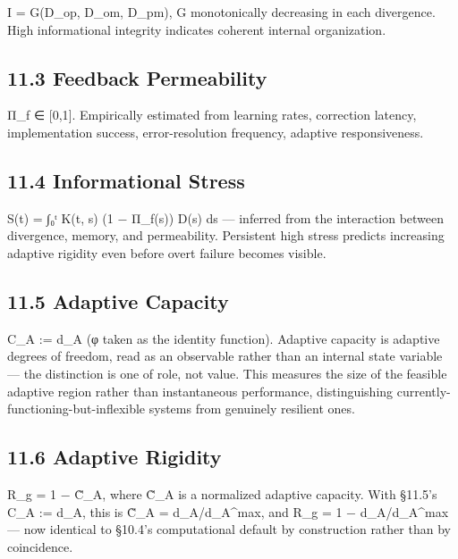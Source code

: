 \documentclass[
]{article}
\begin{document}
I = G(D\_op, D\_om, D\_pm), G monotonically decreasing in each
divergence. High informational integrity indicates coherent internal
organization.

\hypertarget{feedback-permeability-1}{%
\subsection{11.3 Feedback Permeability}\label{feedback-permeability-1}}

Π\_f ∈ {[}0,1{]}. Empirically estimated from learning rates, correction
latency, implementation success, error-resolution frequency, adaptive
responsiveness.

\hypertarget{informational-stress-1}{%
\subsection{11.4 Informational Stress}\label{informational-stress-1}}

S(t) = ∫₀ᵗ K(t, s) (1 − Π\_f(s)) D(s) ds --- inferred from the
interaction between divergence, memory, and permeability. Persistent
high stress predicts increasing adaptive rigidity even before overt
failure becomes visible.

\hypertarget{adaptive-capacity}{%
\subsection{11.5 Adaptive Capacity}\label{adaptive-capacity}}

C\_A := d\_A (φ taken as the identity function). Adaptive capacity is
adaptive degrees of freedom, read as an observable rather than an
internal state variable --- the distinction is one of role, not value.
This measures the size of the feasible adaptive region rather than
instantaneous performance, distinguishing
currently-functioning-but-inflexible systems from genuinely resilient
ones.

\hypertarget{adaptive-rigidity-1}{%
\subsection{11.6 Adaptive Rigidity}\label{adaptive-rigidity-1}}

R\_g = 1 − C̃\_A, where C̃\_A is a normalized adaptive capacity. With
§11.5's C\_A := d\_A, this is C̃\_A = d\_A/d\_A\^{}max, and R\_g = 1 −
d\_A/d\_A\^{}max --- now identical to §10.4's computational default by
construction rather than by coincidence.
\end{document}
